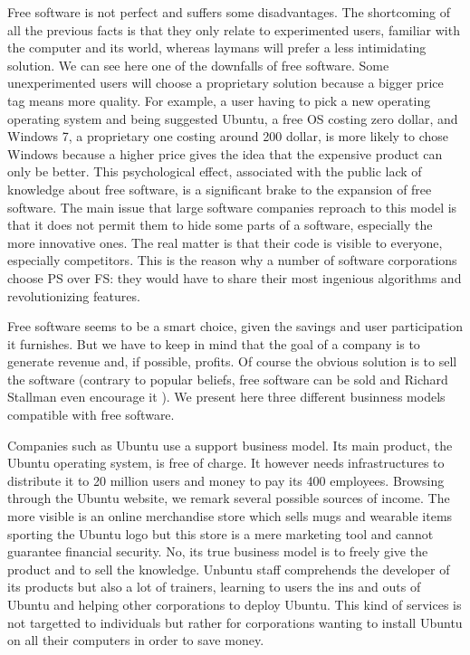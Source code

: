 \documentclass[12pt]{article}
\begin{document}
Free software is not perfect and suffers some disadvantages. The
shortcoming of all the previous facts is that they only relate to
experimented users, familiar with the computer and its world, whereas
laymans will prefer a less intimidating solution. We can see here one
of the downfalls of free software. Some unexperimented users will
choose a proprietary solution because a bigger price tag means more
quality.  For example, a user having to pick a new operating operating
system and being suggested Ubuntu, a free OS costing zero dollar, and
Windows 7, a proprietary one costing around 200 dollar, is more likely
to chose Windows because a higher price gives the idea that the
expensive product can only be better.  This psychological effect,
associated with the public lack of knowledge about free software, is a
significant brake to the expansion of free software. The main issue
that large software companies reproach to this model is that it does
not permit them to hide some parts of a software, especially the more
innovative ones. The real matter is that their code is visible to
everyone, especially competitors. This is the reason why a number of
software corporations choose PS over FS: they would have to share
their most ingenious algorithms and revolutionizing features.

Free software seems to be a smart choice, given the savings and user
participation it furnishes. But we have to keep in mind that the goal
of a company is to generate revenue and, if possible, profits. Of
course the obvious solution is to sell the software (contrary to
popular beliefs, free software can be sold and Richard Stallman even
encourage it \cite{sell}). We present here three different businness
models compatible with free software.

Companies such as Ubuntu use a support business model. Its main
product, the Ubuntu operating system, is free of charge. It however
needs infrastructures to distribute it to 20 million users and money
to pay its 400 employees. Browsing through the Ubuntu website, we
remark several possible sources of income. The more visible is an
online merchandise store which sells mugs and wearable items sporting
the Ubuntu logo but this store is a mere marketing tool and cannot
guarantee financial security.  No, its true business model is to
freely give the product and to sell the knowledge. Unbuntu staff
comprehends the developer of its products but also a lot of trainers,
learning to users the ins and outs of Ubuntu and helping other
corporations to deploy Ubuntu. This kind of services is not targetted
to individuals but rather for corporations wanting to install Ubuntu
on all their computers in order to save money.
\end{document}
